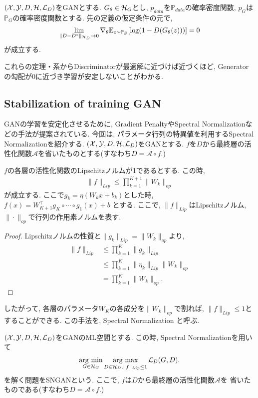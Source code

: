 \begin{Cor}
    $(\mathcal{X}, \mathcal{Y}, D, \mathcal{H}, \mathcal{L}_{D})$をGANとする. $G_{\theta}\in\mathcal{H}_{G}$とし, $p_{data}$を$\mathbb{P}_{data}$の確率密度関数, $p_{G}$は$\mathbb{P}_{G}$の確率密度関数とする. 先の定義の仮定条件の元で, 
    \begin{align*}
        \lim_{\|D - D^{*}\|_{\mathcal{H}_{D}}\to0}\nabla_{\theta}\mathbb{E}_{z\sim\mathbb{P}_{Z}}[\log(1 - D(G_{\theta}(z)))] = 0
    \end{align*}
    が成立する. 
\end{Cor}
これらの定理・系からDiscriminatorが最適解に近づけば近づくほど, Generatorの勾配が0に近づき学習が安定しないことがわかる.
\subsection{Stabilization of training GAN}
GANの学習を安定化させるために, Gradient Penalty\cite{WGAN}やSpectral Normalization\cite{SNGAN}などの手法が提案されている. 
今回は, パラメータ行列の特異値を利用するSpectral Normalizationを紹介する. $(\mathcal{X}, \mathcal{Y}, D, \mathcal{H}, \mathcal{L}_{D})$をGANとする. 
$f$を$D$から最終層の活性化関数$\mathcal{A}$を省いたものとする(すなわち$D = \mathcal{A}\circ f$.)
\begin{Prop}
    $f$の各層の活性化関数のLipschitzノルムが1であるとする. この時, 
    \begin{align*}
        \|f\|_{Lip} \leq \prod_{k = 1}^{K + 1}\|W_{k}\|_{op} 
    \end{align*}
    が成立する. ここで$g_{k} = \eta(W_{k}x + b_{k})$とした時, 
    $f(x) = W_{K + 1}^{\top}g_{K}\circ\cdots\circ g_{1}(x) + b$
    とする. ここで, $\|f\|_{Lip}$はLipschitzノルム, $\|\cdot\|_{op}$で行列の作用素ノルムを表す. 
    \begin{proof}
        Lipschitzノルムの性質と$\|g_{k}\|_{Lip} = \|W_{k}\|_{op}$より,
        \begin{align*}
            \|f\|_{Lip} &\leq \displaystyle \prod_{k = 1}^{K} \|g_{k}\|_{Lip}\\
                        & \leq \displaystyle \prod_{k = 1}^{K} \|\eta_{k}\|_{Lip}\|W_{k}\|_{op}\\
                        & = \displaystyle \prod_{k = 1}^{K} \|W_{k}\|_{op}.
        \end{align*}
    \end{proof}
\end{Prop}
したがって, 各層のパラメータ$W_{K}$の各成分を$\|W_{k}\|_{op}$で割れば, $\|f\|_{Lip}\leq 1$とすることができる.
この手法を, Spectral Normalization と呼ぶ. 
\begin{Defi}
    $(\mathcal{X}, \mathcal{Y}, D, \mathcal{H}, \mathcal{L}_{D})$をGANのML空間とする. この時, Spectral Normalizationを用いて
    \begin{align*}
        \mathop{\rm arg~min}\limits_{G\in\mathcal{H}_{G}}\mathop{\rm arg~max}\limits_{D\in\mathcal{H}_{D}, \|f\|_{Lip}\leq 1}\mathcal{L}_{D}(G, D).
    \end{align*}
    を解く問題をSNGANという. ここで, $f$は$D$から最終層の活性化関数$\mathcal{A}$を
    省いたものである(すなわち$D = \mathcal{A}\circ f$.)
\end{Defi}

